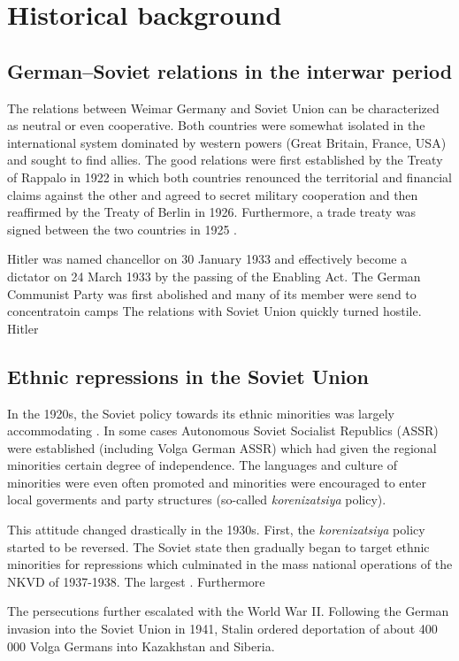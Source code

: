 \documentclass[11pt]{article}
\begin{document}
\section{Historical background}
\subsection{German–Soviet relations in the interwar period}
The relations between Weimar Germany and Soviet Union can be characterized as neutral or even cooperative. Both countries were somewhat isolated in the international system dominated by western powers (Great Britain, France, USA) and sought to find allies. The good relations were first established by the Treaty of Rappalo in 1922 in which both countries renounced the territorial and financial claims against the other and agreed to secret military cooperation and then reaffirmed by the Treaty of Berlin in 1926. Furthermore, a trade treaty was signed between the two countries in 1925 \citep{morgan_political_1963}.

Hitler was named chancellor on 30 January 1933 and effectively become a dictator on 24 March 1933 by the passing of the Enabling Act. The German Communist Party was first abolished and many of its member were send to concentratoin camps
The relations with Soviet Union quickly turned hostile. Hitler 

\subsection{Ethnic repressions in the Soviet Union}
In the 1920s, the Soviet policy towards its ethnic minorities was largely accommodating \citep{martin_affirmative_2001}. In some cases Autonomous Soviet Socialist Republics (ASSR) were established (including Volga German ASSR) which had given the regional minorities certain degree of independence. The languages and culture of minorities were even often promoted and minorities were encouraged to enter local goverments and party structures (so-called \emph{korenizatsiya} policy). 

This attitude changed drastically in the 1930s. First, the  \emph{korenizatsiya} policy started to be reversed. The Soviet state then gradually  began to target ethnic minorities for repressions  which culminated in the mass national operations of the NKVD of 1937-1938. The largest \citep{snyder_bloodlands:_2011}. Furthermore 

The persecutions  further escalated with the World War II. Following the German invasion into the Soviet Union in 1941, Stalin ordered deportation of about 400 000 Volga Germans into Kazakhstan and Siberia. 
\end{document}
